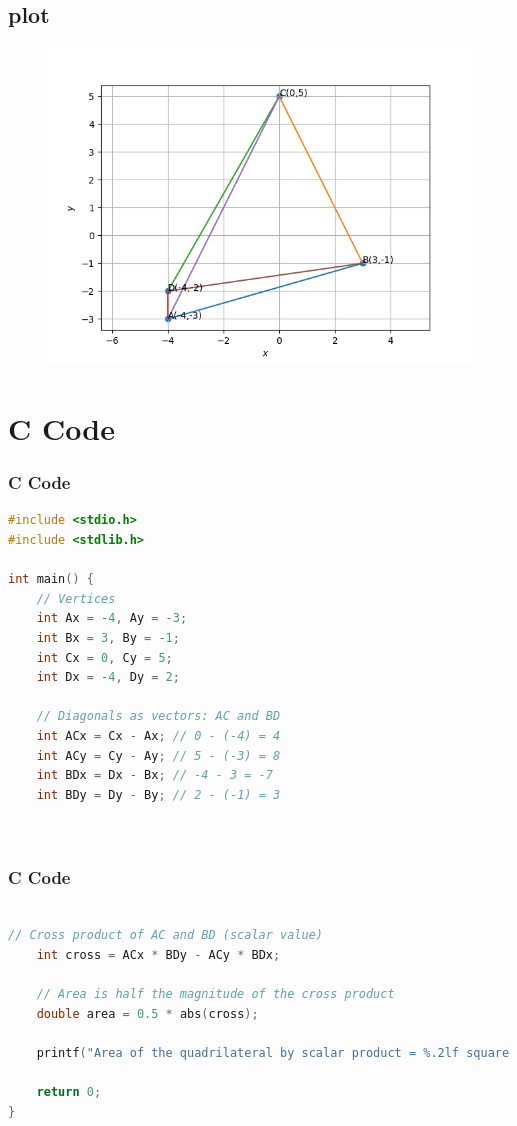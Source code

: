 \documentclass{beamer}
\theoremstyle{remark}
\numberwithin{equation}{section}
\begin{document}
    \subsection{plot}
       \begin{frame}[fragile]
    \begin{figure}[H]
    \centering
    \includegraphics[width = 0.6\columnwidth]{../figs/img.png}
    \caption*{}
    \label{figs}
\end{figure}
\end{frame}
\section{ C Code}
\begin{frame}[fragile]
\frametitle{C Code }
\begin{lstlisting}[language=C]
#include <stdio.h>
#include <stdlib.h>

int main() {
    // Vertices
    int Ax = -4, Ay = -3;
    int Bx = 3, By = -1;
    int Cx = 0, Cy = 5;
    int Dx = -4, Dy = 2;

    // Diagonals as vectors: AC and BD
    int ACx = Cx - Ax; // 0 - (-4) = 4
    int ACy = Cy - Ay; // 5 - (-3) = 8
    int BDx = Dx - Bx; // -4 - 3 = -7
    int BDy = Dy - By; // 2 - (-1) = 3

    
\end{lstlisting}
\end{frame}

\begin{frame}[fragile]
\frametitle{C Code }
\begin{lstlisting}[language=C]
    
// Cross product of AC and BD (scalar value)
    int cross = ACx * BDy - ACy * BDx;

    // Area is half the magnitude of the cross product
    double area = 0.5 * abs(cross);

    printf("Area of the quadrilateral by scalar product = %.2lf square units\n", area);

    return 0;
}
    
\end{lstlisting}
\end{frame}
\end{document}
